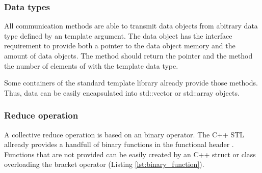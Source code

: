 \subsubsection{Data types}
All communication methods are able to transmit data objects from
abitrary data type defined by an template argument. The data object
has the interface requirement to provide both a pointer to the data
object memory and the amount of data objects. The method 
should return the pointer and the method  the number of
elements of with the template data type.

Some containers of the standard template library already provide those
methods. Thus, data can be easily encapsulated into std::vector
\cite{ref:vector} or std::array \cite{ref:array} objects.

\subsubsection{Reduce operation}
A collective reduce operation is based on an binary operator. The C++
STL allready provides a handfull of binary functions in the functional
header \cite{ref:functional}. Functions that are not provided can be easily created 
by an C++ struct or class overloading the bracket operator \cpp{()}(Listing
\ref{lst:binary_function}). 

